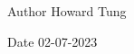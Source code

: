 \begin{DoxyAuthor}{Author}
Howard Tung 
\end{DoxyAuthor}
\begin{DoxyDate}{Date}
02-\/07-\/2023 
\end{DoxyDate}
